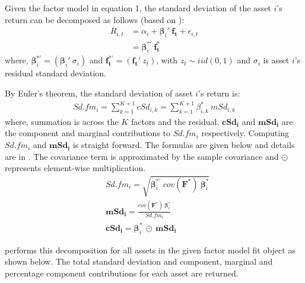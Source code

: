 \documentclass[a4paper]{article}\usepackage[]{graphicx}\usepackage[]{color}
\begin{document}
Given the factor model in equation 1, the standard deviation of the asset $i$'s return can be decomposed as follows (based on \citet{meucci2007risk}):
\begin{align}
R_{i,t} &= \alpha_i + \bm\beta_i' \: \mathbf{f_t} + \epsilon_{i,t} \\
&=  \bm\beta_i^{*'} \: \mathbf{f_t^*}
\end{align}
where, $\bm\beta_i^{*'} = (\bm\beta_i' \: \sigma_i)$ and $\mathbf{f_t^{*'}} = (\mathbf{f_t'} \: z_t)$, with $z_t \sim iid(0, 1)$ and $\sigma_i$ is asset $i$'s residual standard deviation.

By Euler's theorem, the standard deviation of asset $i$'s return is:
\begin{align}
Sd.fm_i = \sum_{k=1}^{K+1} cSd_{i,k} = \sum_{k=1}^{K+1} \beta^*_{i,k} \: mSd_{i,k}
\end{align}
where, summation is across the $K$ factors and the residual, $\mathbf{cSd_i}$ and $\mathbf{mSd_i}$ are the component and marginal contributions to $Sd.fm_i$ respectively. Computing $Sd.fm_i$ and $\mathbf{mSd_i}$ is straight forward. The formulas are given below and details are in \citet{meucci2007risk}. The covariance term is approximated by the sample covariance and $\odot$ represents element-wise multiplication.
\begin{align}
& Sd.fm_i = \sqrt{\bm\beta_i^{*'}\: cov(\mathbf{F^*})\: \bm\beta_i^*} \\
& \mathbf{mSd_i} = \frac{cov(\mathbf{F^*})\: \bm\beta_i^*}{Sd.fm_i} \\
& \mathbf{cSd_i} = \bm\beta_i^* \: \odot \: \mathbf{mSd_i}
\end{align}

 performs this decomposition for all assets in the given factor model fit object as shown below. The total standard deviation and component, marginal and percentage component contributions for each asset are returned.
\end{document}
